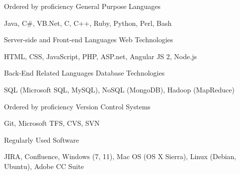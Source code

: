 \begin{cventries}
  \cventry
    {Ordered by proficiency}
    {General Purpose Languages}
    { }
    { }
    {
      \begin{cvitems}
        \item {Java, C\#, VB.Net, C, C++, Ruby, Python, Perl, Bash}
      \end{cvitems}
    }
  \cventry
    {Server-side and Front-end Languages}
    {Web Technologies}
    { }
    { }
    {
      \begin{cvitems}
        \item {HTML, CSS, JavaScript, PHP, ASP.net, Angular JS 2, Node.js}
      \end{cvitems}
    }
  \cventry
    {Back-End Related Languages}
    {Database Technologies}
    { }
    { }
    {
      \begin{cvitems}
        \item {SQL (Microsoft SQL, MySQL), NoSQL (MongoDB), Hadoop (MapReduce)}
      \end{cvitems}
    }
  \cventry
    {Ordered by proficiency}
    {Version Control Systems}
    { }
    { }
    {
      \begin{cvitems}
        \item {Git, Microsoft TFS, CVS, SVN}
      \end{cvitems}
    }
  \cventry
    {Regularly Used}
    {Software}
    { }
    { }
    {
      \begin{cvitems}
        \item {JIRA, Confluence, Windows (7, 11), Mac OS (OS X Sierra), Linux (Debian, Ubuntu), Adobe CC Suite}
      \end{cvitems}
    }
\end{cventries}
